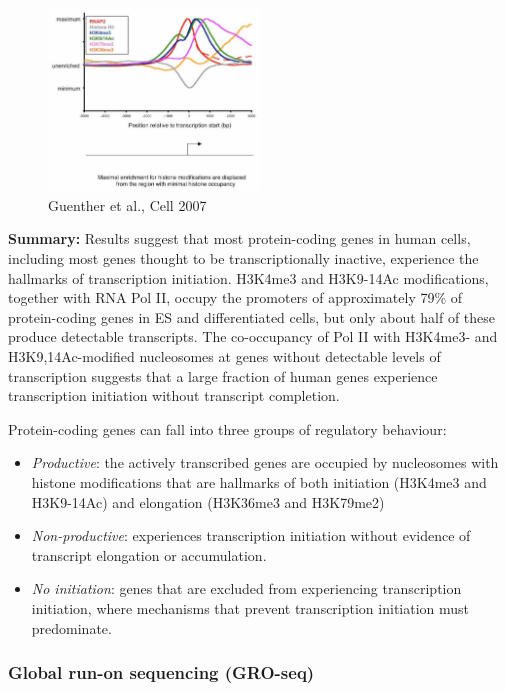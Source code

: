 \begin{figure}
\centering
\includegraphics[width=0.5\textwidth]{../_resources/Screenshot_2022-09-22_at_21-49-05.png}
\caption{Guenther et al., Cell 2007}
\end{figure}

\textbf{Summary:} Results suggest that most protein-coding genes in human cells, including most genes thought to be transcriptionally inactive, experience the hallmarks of transcription initiation. H3K4me3 and H3K9-14Ac modifications, together with RNA Pol II, occupy the promoters of approximately 79\% of protein-coding genes in ES and differentiated cells, but only about half of these produce detectable transcripts. The co-occupancy of Pol II with H3K4me3- and H3K9,14Ac-modified nucleosomes at genes without detectable levels of transcription suggests that a large fraction of human genes experience transcription initiation without transcript completion.

Protein-coding genes can fall into three groups of regulatory behaviour:

\begin{itemize}
\tightlist
\item
  \emph{Productive}: the actively transcribed genes are occupied by nucleosomes with histone modifications that are hallmarks of both initiation (H3K4me3 and H3K9-14Ac) and elongation (H3K36me3 and H3K79me2)
\item
  \emph{Non-productive}: experiences transcription initiation without evidence of transcript elongation or accumulation.
\item
  \emph{No initiation}: genes that are excluded from experiencing transcription initiation, where mechanisms that prevent transcription initiation must predominate.
\end{itemize}

\hypertarget{global-run-on-sequencing-gro-seq}{%
\subsubsection{Global run-on sequencing (GRO-seq)}\label{global-run-on-sequencing-gro-seq}}

